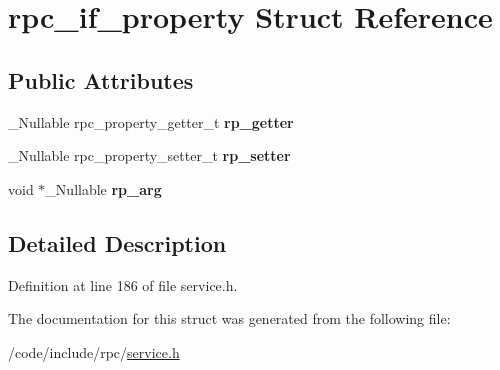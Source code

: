 \hypertarget{structrpc__if__property}{}\section{rpc\+\_\+if\+\_\+property Struct Reference}
\label{structrpc__if__property}
\subsection*{Public Attributes}
\begin{DoxyCompactItemize}
\item 
\+\_\+\+Nullable rpc\+\_\+property\+\_\+getter\+\_\+t {\bfseries rp\+\_\+getter}\hypertarget{structrpc__if__property_a2b294c7fed3665f1a58020040ec13aee}{}\label{structrpc__if__property_a2b294c7fed3665f1a58020040ec13aee}

\item 
\+\_\+\+Nullable rpc\+\_\+property\+\_\+setter\+\_\+t {\bfseries rp\+\_\+setter}\hypertarget{structrpc__if__property_a02e1f9e6e5680714278ed6dd67987d67}{}\label{structrpc__if__property_a02e1f9e6e5680714278ed6dd67987d67}

\item 
void $\ast$\+\_\+\+Nullable {\bfseries rp\+\_\+arg}\hypertarget{structrpc__if__property_a81d2953a7a4bdff1775330c29992546b}{}\label{structrpc__if__property_a81d2953a7a4bdff1775330c29992546b}

\end{DoxyCompactItemize}


\subsection{Detailed Description}


Definition at line 186 of file service.\+h.



The documentation for this struct was generated from the following file\+:\begin{DoxyCompactItemize}
\item 
/code/include/rpc/\hyperlink{service_8h}{service.\+h}\end{DoxyCompactItemize}
